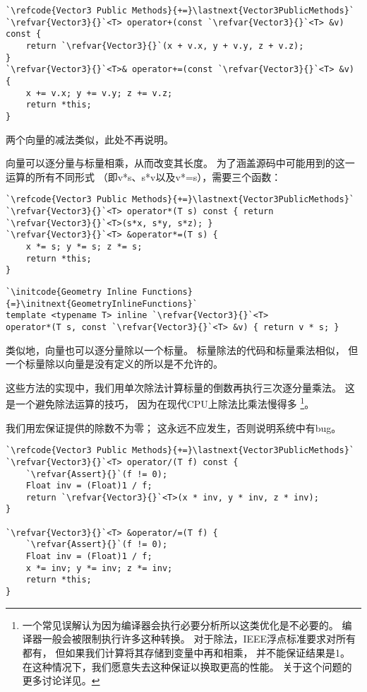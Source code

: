 \begin{lstlisting}
`\refcode{Vector3 Public Methods}{+=}\lastnext{Vector3PublicMethods}`
`\refvar{Vector3}{}`<T> operator+(const `\refvar{Vector3}{}`<T> &v) const {
    return `\refvar{Vector3}{}`(x + v.x, y + v.y, z + v.z);
}
`\refvar{Vector3}{}`<T>& operator+=(const `\refvar{Vector3}{}`<T> &v) {
    x += v.x; y += v.y; z += v.z;
    return *this;
}
\end{lstlisting}

两个向量的减法类似，此处不再说明。

向量可以逐分量与标量相乘，从而改变其长度。
为了涵盖源码中可能用到的这一运算的所有不同形式
（即{\ttfamily v*s}、{\ttfamily s*v}以及{\ttfamily v*=s}），需要三个函数：
\begin{lstlisting}
`\refcode{Vector3 Public Methods}{+=}\lastnext{Vector3PublicMethods}`
`\refvar{Vector3}{}`<T> operator*(T s) const { return `\refvar{Vector3}{}`<T>(s*x, s*y, s*z); }
`\refvar{Vector3}{}`<T> &operator*=(T s) {
    x *= s; y *= s; z *= s;
    return *this;
}
\end{lstlisting}
\begin{lstlisting}
`\initcode{Geometry Inline Functions}{=}\initnext{GeometryInlineFunctions}`
template <typename T> inline `\refvar{Vector3}{}`<T>
operator*(T s, const `\refvar{Vector3}{}`<T> &v) { return v * s; }
\end{lstlisting}

类似地，向量也可以逐分量除以一个标量。
标量除法的代码和标量乘法相似，
但一个标量除以向量是没有定义的所以是不允许的。

这些方法的实现中，我们用单次除法计算标量的倒数再执行三次逐分量乘法。
这是一个避免除法运算的技巧，
因为在现代CPU上除法比乘法慢得多
\footnote{一个常见误解认为因为编译器会执行必要分析所以这类优化是不必要的。
    编译器一般会被限制执行许多这种转换。
    对于除法，IEEE浮点标准要求对所有都有，
    但如果我们计算将其存储到变量中再和相乘，
    并不能保证结果是1。
    在这种情况下，我们愿意失去这种保证以换取更高的性能。
    关于这个问题的更多讨论详见\protect{}。}。

我们用宏保证提供的除数不为零；
这永远不应发生，否则说明系统中有bug。
\begin{lstlisting}
`\refcode{Vector3 Public Methods}{+=}\lastnext{Vector3PublicMethods}`
`\refvar{Vector3}{}`<T> operator/(T f) const {
    `\refvar{Assert}{}`(f != 0);
    Float inv = (Float)1 / f;
    return `\refvar{Vector3}{}`<T>(x * inv, y * inv, z * inv);
}

`\refvar{Vector3}{}`<T> &operator/=(T f) {
    `\refvar{Assert}{}`(f != 0);
    Float inv = (Float)1 / f;
    x *= inv; y *= inv; z *= inv;
    return *this;
}
\end{lstlisting}

